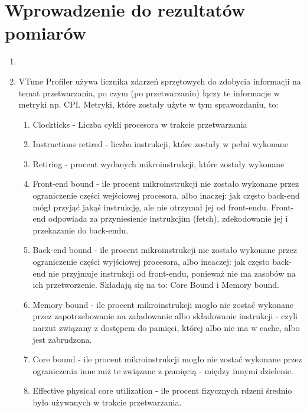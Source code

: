 \documentclass[12pt]{article}
\begin{document}
\section {Wprowadzenie do rezultatów pomiarów}
\begin{enumerate}
	\item 
	\item VTune Profiler używa licznika zdarzeń sprzętowych do zdobycia informacji na temat przetwarzania, po czym (po przetwarzaniu) łączy te informacje w metryki np. CPI. Metryki, które zostały użyte w tym sprawozdaniu, to: 
	\begin{enumerate}
		\item Clockticks - Liczba cykli procesora w trakcie przetwarzania
		\item Instructions retired - liczba instrukcji, które zostały w pełni wykonane
		\item Retiring - procent wydanych mikroinstrukcji, które zostały wykonane
		\item Front-end bound - ile procent mikroinstrukcji nie zostało wykonane przez ograniczenie części wejściowej procesora, albo inaczej: jak często back-end mógł przyjąć jakąś instrukcję, ale nie otrzymał jej od front-endu. Front-end odpowiada za przyniesienie instrukcjim (fetch), zdekodowanie jej i przekazanie do back-endu.
		\item Back-end bound - ile procent mikroinstrukcji nie zostało wykonane przez ograniczenie części wyjściowej procesora, albo incaczej: jak często back-end nie przyjmuje instrukcji od front-endu, ponieważ nie ma zasobów na ich przetworzenie. Składają się na to: Core Bound i Memory bound.
		\item Memory bound - ile procent mikroinstrukcji mogło nie zostać wykonane przez zapotrzebowanie na załadowanie albo składowanie instrukcji - czyli narzut związany z dostępem do pamięci, której albo nie ma w cache, albo jest zabrudzona.
		\item Core bound - ile procent mikroinstrukcji mogło nie zostać wykonane przez ograniczenia inne miż te związane z pamięcią - między innymi dzielenie.
		\item Effective physical core utilization - ile procent fizycznych rdzeni średnio było używanych w trakcie przetwarzania.
	\end{enumerate}
\end{enumerate}
\end{document}
